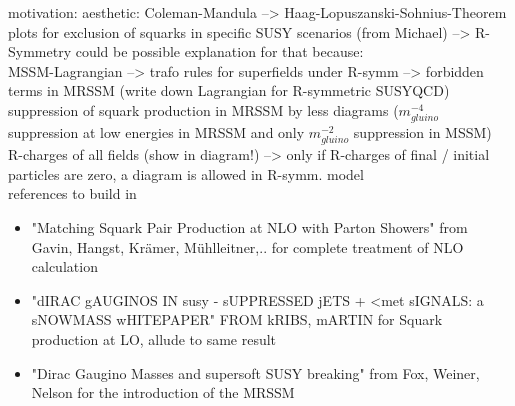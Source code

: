 motivation: aesthetic: Coleman-Mandula --> Haag-Lopuszanski-Sohnius-Theorem\\
plots for exclusion of squarks in specific SUSY scenarios (from Michael) --> R-Symmetry could be possible explanation for that because:\\
MSSM-Lagrangian --> trafo rules for superfields under R-symm --> forbidden terms in MRSSM (write down Lagrangian for R-symmetric SUSYQCD)\\
suppression of squark production in MRSSM by less diagrams ($m_{gluino}^{-4}$ suppression at low energies in MRSSM and only $m_{gluino}^{-2}$ suppression in MSSM)\\
R-charges of all fields (show in diagram!) --> only if R-charges of final / initial particles are zero, a diagram is allowed in R-symm. model\\
references to build in
\begin{itemize}
\item "Matching Squark Pair Production at NLO with Parton Showers" from Gavin, Hangst, Krämer, Mühlleitner,.. for complete treatment of NLO calculation\\
\item "dIRAC gAUGINOS IN susy - sUPPRESSED jETS + <met sIGNALS: a sNOWMASS wHITEPAPER" FROM kRIBS, mARTIN for Squark production at LO, allude to same result\\
\item "Dirac Gaugino Masses and supersoft SUSY breaking" from Fox, Weiner, Nelson for the introduction of the MRSSM
\end{itemize}